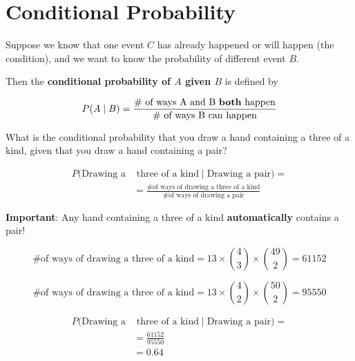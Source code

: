 \section{Conditional Probability}

%
\begin{frame}

Suppose we know that one event $C$ has already happened or will happen (the
condition), and we want to know the probability of different event $B$.

\hfill

Then the \textbf{conditional probability of $A$ given $B$} is defined by

$$ P(A \mid B) = \frac{\text{\# of ways A and B \textbf{both} happen}}{\text{\#
of ways B can happen}} $$

\end{frame}
%

%
\begin{frame}

What is the conditional probability that you draw a hand containing a three of a
kind, given that you draw a hand containing a pair?

\begin{align*}
P(\text{Drawing a} & \text{ three of a kind} \mid \text{Drawing a pair}) = \\ 
&= \frac{\text{\# of ways of drawing a three of a kind}}{\text{\# of ways of
drawing a pair}}
\end{align*}

\textbf{Important}: Any hand containing a three of a kind \textbf{automatically}
contains a pair!

\end{frame}
%

%
\begin{frame}

$$ \text{\# of ways of drawing a three of a kind} = 13 \times {{4}\choose{3}}
\times {{49}\choose{2}} = 61152 $$

$$ \text{\# of ways of drawing a three of a kind} = 13 \times {{4}\choose{2}}
\times {{50}\choose{2}} = 95550 $$

\end{frame}
%

%
\begin{frame}

\begin{align*}
P(\text{Drawing a} & \text{ three of a kind} \mid \text{Drawing a pair}) = \\ 
&= \frac{61152}{95550} \\
&= 0.64
\end{align*}

\end{frame}
%

